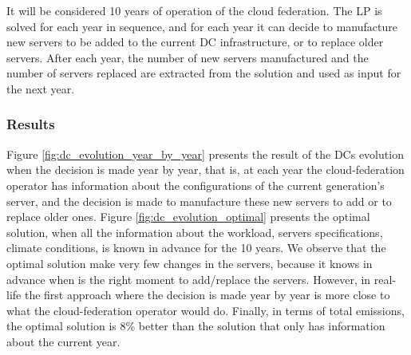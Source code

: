 It will be considered 10 years of operation of the cloud federation. The LP is solved for each year in sequence, and for each year it can decide to manufacture new servers to be added to the current DC infrastructure, or to replace older servers. After each year, the number of new servers manufactured and the number of servers replaced are extracted from the solution and used as input for the next year. 

\subsubsection{Results}

Figure \ref{fig:dc_evolution_year_by_year} presents the result of the DCs evolution when the decision is made year by year, that is, at each year the cloud-federation operator has information about the configurations of the current generation's server, and the decision is made to manufacture these new servers to add or to replace older ones. Figure \ref{fig:dc_evolution_optimal} presents the optimal solution, when all the information about the workload, servers specifications, climate conditions, is known in advance for the 10 years. We observe that the optimal solution make very few changes in the servers, because it knows in advance when is the right moment to add/replace the servers. However, in real-life the first approach where the decision is made year by year is more close to what the cloud-federation operator would do. Finally, in terms of total  emissions, the optimal solution is 8\% better than the solution that only has information about the current year.

